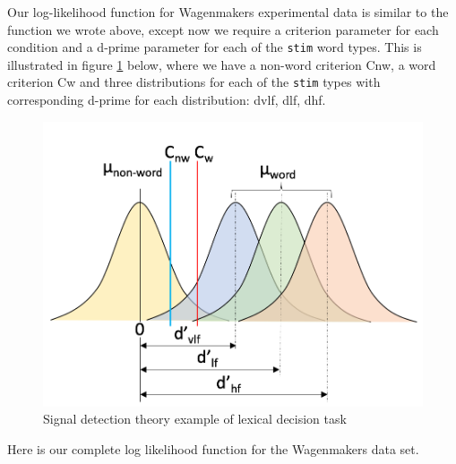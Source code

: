 \documentclass[]{book}
\begin{document}
Our log-likelihood function for Wagenmakers experimental data is similar to the function we wrote above, except now we require a criterion parameter for each condition and a d-prime parameter for each of the \texttt{stim} word types. This is illustrated in figure \ref{fig:SDT3} below, where we have a non-word criterion Cnw, a word criterion Cw and three distributions for each of the \texttt{stim} types with corresponding d-prime for each distribution: dvlf, dlf, dhf.

\begin{figure}
\includegraphics[width=1\linewidth]{SDT_3} \caption{Signal detection theory example of lexical decision task}\label{fig:SDT3}
\end{figure}

Here is our complete log likelihood function for the Wagenmakers data set.
\end{document}
